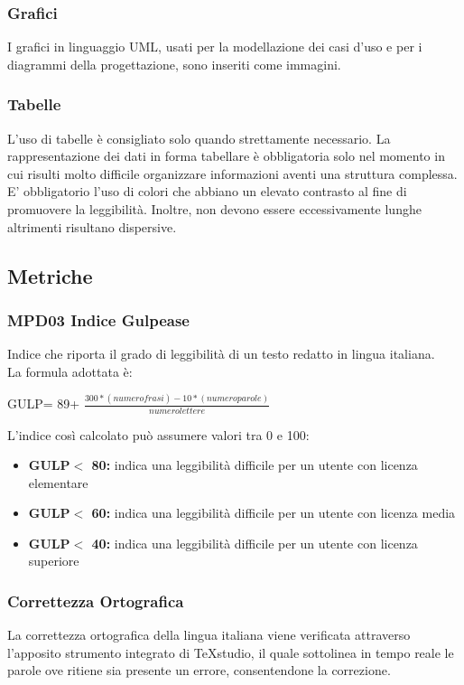 \subsubsection{Grafici}
I grafici in linguaggio UML, usati per la modellazione dei casi d’uso e per i diagrammi della progettazione, sono inseriti come immagini.
\subsubsection{Tabelle}
L’uso di tabelle è consigliato solo quando strettamente necessario. La rappresentazione dei dati in forma tabellare è obbligatoria solo nel momento in cui risulti molto difficile organizzare informazioni aventi una struttura complessa.
E' obbligatorio l’uso di colori che abbiano un elevato contrasto al fine di promuovere la leggibilità. Inoltre, non devono essere eccessivamente lunghe altrimenti risultano dispersive.
\subsection{Metriche}
\subsubsection{MPD03 Indice Gulpease}
Indice che riporta il grado di leggibilità di un testo redatto in lingua italiana. 
\\La formula adottata è:
\begin{center}
GULP= 89+ $\frac{300*(numero frasi)-10*(numero parole)}{numero lettere}$
\end{center}
L'indice così calcolato può assumere valori tra 0 e 100:
\begin{itemize}
\item \textbf{GULP$<$ 80:} indica una leggibilità difficile per un utente con licenza elementare
	\item \textbf{GULP$<$ 60:} indica una leggibilità difficile per un utente con licenza media
		\item \textbf{GULP$<$ 40:} indica una leggibilità difficile per un utente con licenza superiore
\end{itemize}

\subsubsection{Correttezza Ortografica}
La correttezza ortografica della lingua italiana viene verificata attraverso l'apposito strumento integrato di \TeX studio, il quale sottolinea in tempo reale le parole ove ritiene sia presente un errore, consentendone la correzione.
